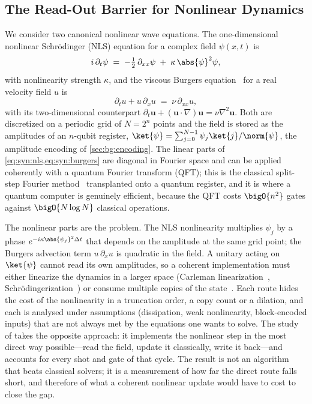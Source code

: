 \subsection{The Read-Out Barrier for Nonlinear Dynamics}\label{sec:syn:waves-problem}

We consider two canonical nonlinear wave equations. The one-dimensional nonlinear Schr\"odinger (NLS) equation for a complex field $\psi(x,t)$ is
\begin{equation}\label{eq:syn:nls}
  i\,\partial_t\psi \;=\; -\tfrac{1}{2}\,\partial_{xx}\psi \;+\; \kappa\,\abs{\psi}^{2}\psi ,
\end{equation}
with nonlinearity strength $\kappa$, and the viscous Burgers equation~\cite{burgers1948turbulence} for a real velocity field $u$ is
\begin{equation}\label{eq:syn:burgers}
  \partial_t u + u\,\partial_x u \;=\; \nu\,\partial_{xx}u ,
\end{equation}
with its two-dimensional counterpart $\partial_t \mathbf{u}+(\mathbf{u}\cdot\nabla)\mathbf{u}=\nu\nabla^{2}\mathbf{u}$. Both are discretized on a periodic grid of $N=2^{n}$ points and the field is stored as the amplitudes of an $n$-qubit register, $\ket{\psi}=\sum_{j=0}^{N-1}\psi_j\ket{j}/\norm{\psi}$, the amplitude encoding of \cref{sec:bg:encoding}. The linear parts of \cref{eq:syn:nls,eq:syn:burgers} are diagonal in Fourier space and can be applied coherently with a quantum Fourier transform (QFT); this is the classical split-step Fourier method~\cite{weideman1986splitstep} transplanted onto a quantum register, and it is where a quantum computer is genuinely efficient, because the QFT costs $\bigO{n^{2}}$ gates against $\bigO{N\log N}$ classical operations.

The nonlinear parts are the problem. The NLS nonlinearity multiplies $\psi_j$ by a phase $e^{-i\kappa\abs{\psi_j}^{2}\Delta t}$ that depends on the amplitude at the same grid point; the Burgers advection term $u\,\partial_x u$ is quadratic in the field. A unitary acting on $\ket{\psi}$ cannot read its own amplitudes, so a coherent implementation must either linearize the dynamics in a larger space (Carleman linearization~\cite{liu2021carleman}, Schr\"odingerization~\cite{jin2024schrodingerization}) or consume multiple copies of the state~\cite{lloyd2020nonlinear}. Each route hides the cost of the nonlinearity in a truncation order, a copy count or a dilation, and each is analysed under assumptions (dissipation, weak nonlinearity, block-encoded inputs) that are not always met by the equations one wants to solve. The study of \cite{guo2026nonlinearwaves} takes the opposite approach: it implements the nonlinear step in the most direct way possible---read the field, update it classically, write it back---and accounts for every shot and gate of that cycle. The result is not an algorithm that beats classical solvers; it is a measurement of how far the direct route falls short, and therefore of what a coherent nonlinear update would have to cost to close the gap.

